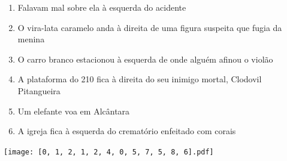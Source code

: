 \documentclass[12pt]{article}
\begin{document}
		 

\pagebreak


	\begin{enumerate}
		  \sffamily %
		  \large %


\vfill \item
Falavam mal sobre ela	%
à esquerda
do acidente	%

\vfill \item
O vira-lata caramelo anda	%
à direita
de uma figura suspeita que fugia da menina	%

\vfill \item
O carro branco estacionou	%
à esquerda
de onde alguém afinou o violão	%

\vfill \item
A plataforma do 210 fica	%
à direita
do seu inimigo mortal, Clodovil Pitangueira	%

\vfill \item
Um elefante voa	%
em Alcântara	%

\vfill \item
A igreja fica	%
à esquerda
do crematório enfeitado com corais	%
	\end{enumerate}
		  
		  \hfill

		  \vfill

\texttt{[image: [0, 1, 2, 1, 2, 4, 0, 5, 7, 5, 8, 6].pdf]}


	\hfill	  	  


\pagebreak			
\end{document}
